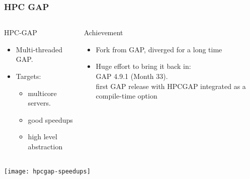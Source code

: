 \documentclass{beamer}
\newcommand{\thus}{\textcolor{red}{\MVRightarrow{}}\xspace}
\begin{document}
\begin{frame}
  \frametitle{HPC GAP}

  \begin{columns}
    \begin{column}{.39\textwidth}
        \begin{block}{HPC-GAP}
          \begin{itemize}
          \item Multi-threaded GAP.
          \item Targets:
            \begin{itemize}
            \item multicore servers.
            \item good speedups
            \item high level abstraction
            \end{itemize}
          \end{itemize}
        \end{block}
    \end{column}
    
    \begin{column}{.59\textwidth}
      \begin{block} {Achievement}
        \begin{itemize}
        \item Fork from GAP,  diverged for a long time
        \item Huge effort to bring it back in:\\   GAP 4.9.1 (Month 33).\\
          \thus first GAP release with HPCGAP integrated as a compile-time option
        \end{itemize}
      \end{block}
    \end{column}
  \end{columns}

  \begin{center}
    \texttt{[image: hpcgap-speedups]}
  \end{center}


\end{frame}
\end{document}
